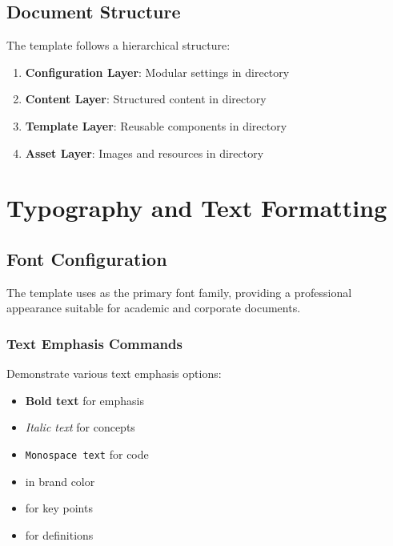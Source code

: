 \documentclass{internshipreport}
\begin{document}
\section{Document Structure}

The template follows a hierarchical structure:

\begin{enumerate}
\item \textbf{Configuration Layer}: Modular settings in  directory
\item \textbf{Content Layer}: Structured content in  directory
\item \textbf{Template Layer}: Reusable components in  directory
\item \textbf{Asset Layer}: Images and resources in  directory
\end{enumerate}

\chapter{Typography and Text Formatting}
\label{chap:typography}

\section{Font Configuration}

The template uses  as the primary font family, providing a professional appearance suitable for academic and corporate documents.

\subsection{Text Emphasis Commands}

Demonstrate various text emphasis options:

\begin{itemize}
\item \textbf{Bold text} for emphasis
\item \textit{Italic text} for concepts
\item \texttt{Monospace text} for code
\item {} in brand color
\item {} for key points
\item {} for definitions
\end{itemize}
\end{document}
